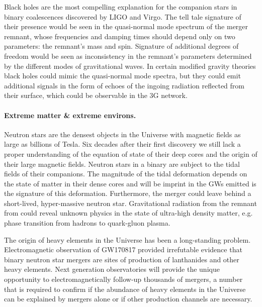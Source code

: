 \documentclass[twocolumn,aps,prd,nofootinbib,superscriptaddress,10pt,notitlepage,preprintnumbers] {revtex4-1}
\begin{document}
Black holes are the most compelling explanation for the companion stars in binary coalescences discovered by LIGO and Virgo. The tell tale signature of their presence would be seen in the quasi-normal mode spectrum of the merger remnant, whose frequencies and damping times should depend only on two parameters: the remnant's mass and spin. Signature of additional degrees of freedom would be seen as inconsistency in the remnant's parameters determined by the different modes of gravitational waves. In certain modified gravity theories black holes could mimic the quasi-normal mode spectra, but they could emit additional signals in the form of echoes of the ingoing radiation reflected from their surface, which could be observable in the 3G network.



\noindent \paragraph{Extreme matter \& extreme environs.}
Neutron stars are the densest objects in the Universe with magnetic fields as large as billions of Tesla. Six decades after their first discovery we still lack a proper understanding of the equation of state of their deep cores and the origin of their large magnetic fields. Neutron stars in a binary are subject to the tidal fields of their companions. The magnitude of the tidal deformation depends on the state of matter in their dense cores and will be imprint in the GWs emitted is the signature of this deformation.  Furthermore, the merger could leave behind a short-lived, hyper-massive neutron star. Gravitational radiation from the remnant from could reveal unknown physics in the state of ultra-high density matter, e.g. phase transition from hadrons to quark-gluon plasma.

The origin of heavy elements in the Universe has been a long-standing problem. Electromagnetic observation of GW170817 provided irrefutable evidence that binary neutron star mergers are sites of production of lanthanides and other heavy elements. Next generation observatories will provide the unique opportunity to electromagnetically follow-up thousands of mergers, a number that is required to confirm if the abundance of heavy elements in the Universe can be explained by mergers alone or if other production channels are necessary.
\end{document}
